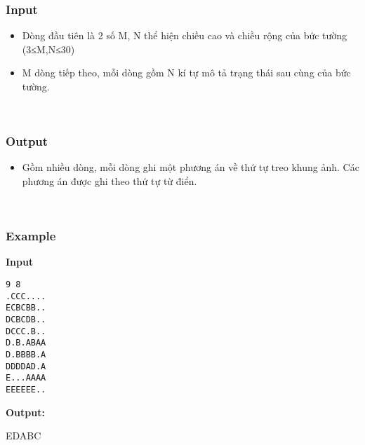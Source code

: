 \subsubsection{Input}
\begin{itemize}
	\item Dòng đầu tiên là 2 số M, N thể hiện chiều cao và chiều rộng của bức tường (3≤M,N≤30)
	\item M dòng tiếp theo, mỗi dòng gồm N kí tự mô tả trạng thái sau cùng của bức tường.
\end{itemize}

 

\subsubsection{Output}
\begin{itemize}
	\item Gồm nhiều dòng, mỗi dòng ghi một phương án về thứ tự treo khung ảnh. Các phương án được ghi theo thứ tự từ điển.
\end{itemize}

 

\subsubsection{Example}

\textbf{Input}
\begin{verbatim}
9 8
.CCC....
ECBCBB..
DCBCDB..
DCCC.B..
D.B.ABAA
D.BBBB.A
DDDDAD.A
E...AAAA
EEEEEE..
\end{verbatim}




\textbf{Output:}





EDABC

 
